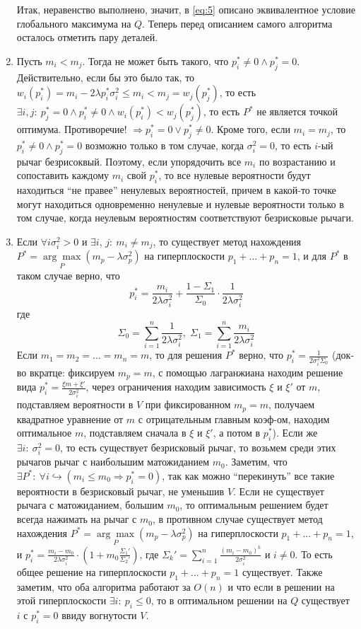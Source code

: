 \begin{enumerate}
    Итак, неравенство выполнено, значит, в \ref{eq:5} описано эквивалентное условие глобального максимума на $Q$. Теперь перед описанием самого алгоритма осталось отметить пару деталей.
    \item \label{itm:4} Пусть $m_i < m_j$. Тогда не может быть такого, что $p_i^* \neq 0 \land p_j^* = 0$. Действительно, если бы это было так, то $w_i(p_i^*) = m_i - 2 \lambda p_i^* \sigma_i^2 \leq m_i < m_j = w_j(p_j^*)$, то есть $\exists i,j: \: p_j^* = 0 \land p_i^* \neq 0 \land w_i(p_i^*) <  w_j(p_j^*)$, то есть $P^*$ не является точкой оптимума. Противоречие! $\Rightarrow p_i^* = 0 \lor p_j^* \neq 0$. Кроме того, если $m_i = m_j$, то $p_i^* \neq 0 \land p_j^* = 0$ возможно только в том случае, когда $\sigma_i^2 = 0$, то есть $i$-ый рычаг безрисоквый. Поэтому, если упорядочить все $m_i$ по возрастанию и сопоставить каждому $m_i$ свой $p_i^*$, то все нулевые вероятности будут находиться ``не правее'' ненулевых вероятностей, причем в какой-то точке могут находиться одновременно ненулевые и нулевые вероятности только в том случае, когда неулевым вероятностям соответствуют безрисковые рычаги.
    \item\label{itm:5} Если $\forall i \sigma_i^2 > 0$ и $\exists i,\, j: \: m_i \neq m_j$, то существует метод нахождения $P^* = \underset{P}{\arg \max} (m_p - \lambda \sigma_p^2)$ на гиперплоскости $p_1 + ... + p_n = 1$, и для $P^*$ в таком случае верно, что 
    $$p_i^* = \frac{m_i}{2\lambda \sigma_i^2} + \frac{1 - \Sigma_1}{\Sigma_0} \cdot \frac{1}{2 \lambda \sigma_i^2}$$
    где 
    $$\Sigma_0 = \sum_{i=1}^n \frac{1}{2 \lambda \sigma_i^2}, \; \Sigma_1 = \sum_{i=1}^n \frac{m_i}{2 \lambda \sigma_i^2}$$ 
    Если $m_1 = m_2 = ... = m_n = m$, то для решения $P^*$ верно, что $p_i^* = \frac{1}{2\sigma_i^2 \Sigma_0}$ (док-во вкратце: фиксируем $m_p = m$, с помощью лагранжиана находим решение вида $p_i^* = \frac{\xi m + \xi'}{2\sigma_i^2}$, через ограничения находим зависимость $\xi$ и $\xi'$ от $m$, подставляем вероятности в $V$ при фиксированном $m_p = m$, получаем квадратное уравнение от $m$ с отрицательным главным коэф-ом, находим оптимальное $m$, подставляем сначала в $\xi$ и $\xi'$, а потом в $p_i^*$). Если же $\exists i: \: \sigma_i^2 = 0$, то есть существует безрисковый рычаг, то возьмем среди этих рычагов рычаг с наибольшим матожиданием $m_0$. Заметим, что $\exists P^*: \: \forall i \hookrightarrow (m_i \leq m_0 \Rightarrow p_i^* = 0)$, так как можно ``перекинуть'' все такие вероятности в безрисковый рычаг, не уменьшив $V$. Если не существует рычага с матожиданием, большим $m_0$, то оптимальным решением будет всегда нажимать на рычаг с $m_0$, в противном случае существует метод нахождения $P^* = \underset{P}{\arg \max} (m_p - \lambda \sigma_p^2)$ на гиперплоскости $p_1 + ... + p_n = 1$, и $p_i^* = \frac{m_i - m_0}{2 \lambda \sigma_i^2} \cdot \left(1 + m_0 \frac{\Sigma_1'}{\Sigma_2'} \right)$, где $\Sigma_k' = \sum_{i=1}^n \frac{(m_i - m_0)^k}{2 \sigma_i^2}$ и $i \neq 0$. То есть общее решение на гиперплоскости $p_1 + ... + p_n = 1$ существует. Также заметим, что оба алгоритма работают за $O(n)$ и что если в решении на этой гиперплоскости $\exists i: \: p_i \leq 0$, то в оптимальном решении на $Q$ существует $i$ с $p_i^* = 0$ ввиду вогнутости $V$.

\end{enumerate}
